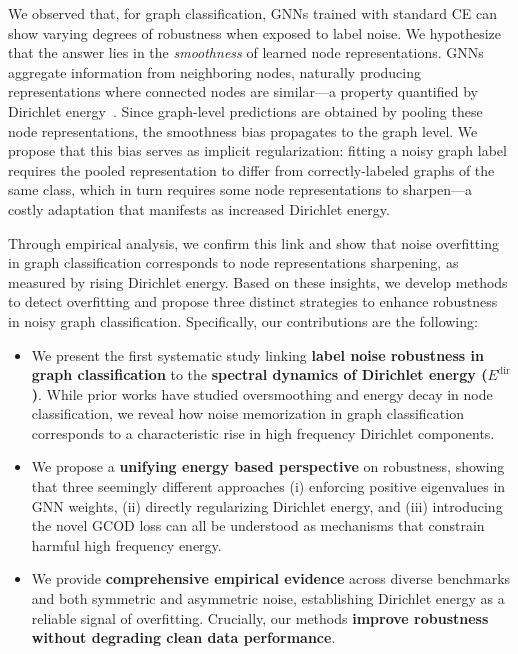 %
We observed that, for graph classification, GNNs trained with standard CE can show varying degrees of robustness when exposed to label noise.
%
%
%
We hypothesize that the answer lies in the \emph{smoothness} of learned node representations.
%
GNNs aggregate information from neighboring nodes, naturally producing representations where connected nodes are similar---a property quantified by Dirichlet energy~\cite{dirichlet}. 
%
Since graph-level predictions are obtained by pooling these node representations, the smoothness bias propagates to the graph level.
%
We propose that this bias serves as implicit regularization: fitting a noisy graph label requires the pooled representation to differ from correctly-labeled graphs of the same class, which in turn requires some node representations to sharpen---a costly adaptation that manifests as increased Dirichlet energy.

Through empirical analysis, we confirm this link and show that noise overfitting in graph classification corresponds to node representations sharpening, as measured by rising Dirichlet energy.
%
Based on these insights, we develop methods to detect overfitting and propose three distinct strategies to enhance robustness in noisy graph classification.
%
Specifically, our contributions are the following: 



\begin{itemize}
\item We present the first systematic study linking \textbf{label noise robustness in graph classification}  to the \textbf{spectral dynamics of Dirichlet energy ($E^{\text{dir}}$)}. While prior works have studied oversmoothing  and energy decay in node classification, we reveal how noise memorization in graph classification  corresponds to a characteristic rise in high frequency Dirichlet components.
\item We propose a \textbf{unifying energy based perspective} on robustness, showing that three seemingly 
different approaches (i) enforcing positive eigenvalues in GNN weights, (ii) directly regularizing 
Dirichlet energy, and (iii) introducing the novel GCOD loss can all be understood as mechanisms 
that constrain harmful high frequency energy.
\item We provide \textbf{comprehensive empirical evidence} across diverse benchmarks and both symmetric and asymmetric noise, establishing  Dirichlet energy as a reliable signal of overfitting. Crucially, our methods \textbf{improve robustness without degrading clean data performance}.
\end{itemize}


